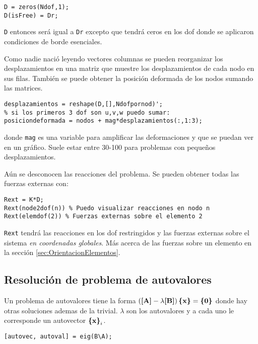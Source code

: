\begin{lstlisting}[caption={Recuperación de desplazamientos globales.}]
D = zeros(Ndof,1);
D(isFree) = Dr;
\end{lstlisting}
\texttt{D} entonces será igual a \texttt{Dr} excepto que tendrá ceros en los dof donde se aplicaron condiciones de borde esenciales.

Como nadie nació leyendo vectores columnas se pueden reorganizar los desplazamientos en una matriz que muestre los desplazamientos de cada nodo en sus filas. También se puede obtener la posición deformada de los nodos sumando las matrices.
\begin{lstlisting}[caption={Obtención de posición deformada.}]
desplazamientos = reshape(D,[],Ndofpornod)';
% si los primeros 3 dof son u,v,w puedo sumar:
posiciondeformada = nodos + mag*desplazamientos(:,1:3); 
\end{lstlisting}
donde \texttt{mag} es una variable para amplificar las deformaciones y que se puedan ver en un gráfico. Suele estar entre 30-100 para problemas con pequeños desplazamientos.

Aún se desconocen las reacciones del problema. Se pueden obtener todas las fuerzas externas con:
\begin{lstlisting}[caption = {Obtención de reacciones.}]
Rext = K*D;
Rext(node2dof(n)) % Puedo visualizar reacciones en nodo n
Rext(elemdof(2)) % Fuerzas externas sobre el elemento 2
\end{lstlisting}
\texttt{Rext} tendrá las reacciones en los dof restringidos y las fuerzas externas sobre el sistema \textit{en coordenadas globales}. Más acerca de las fuerzas sobre un elemento en la sección \ref{sec:OrientacionElementos}.

\subsection*{Resolución de problema de autovalores}
Un problema de autovalores tiene la forma $\left(\boldsymbol{[}\mathbf{A} \boldsymbol{]} - \lambda \boldsymbol{[}\mathbf{B} \boldsymbol{]} \right) \boldsymbol{\{ }\mathbf{x} \boldsymbol{\}} = \boldsymbol{\{ }\mathbf{0} \boldsymbol{\}}$ donde hay otras soluciones ademas de la trivial. $\lambda$ son los autovalores y a cada uno le corresponde un autovector $\boldsymbol{\{ }\mathbf{x} \boldsymbol{\}}_i$.

\begin{lstlisting}[caption={Resolución de problema de autovalores}]
[autovec, autoval] = eig(B\A);
\end{lstlisting}